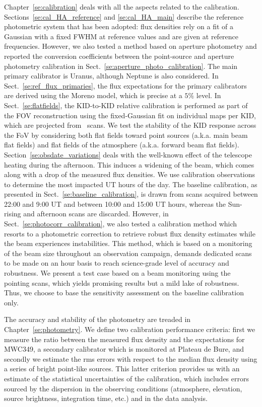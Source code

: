 Chapter~\ref{se:calibration} deals with all the aspects related to the
calibration. Sections~\ref{se:cal_HA_reference}
and \ref{se:cal_HA_main} describe the reference photometric system
that has been adopted: flux densities rely on a fit
of a Gaussian with a fixed FWHM at reference values and are given at
reference frequencies. However, we also tested a method based on aperture
photometry and reported the conversion coefficients between the
point-source and aperture photometry calibration in
Sect.~\ref{se:aperture_photo_calibration}.
The main primary calibrator is Uranus, although Neptune
is also considered. In Sect.~\ref{se:ref_flux_primaries}, the flux
expectations for the primary calibrators are derived using the Moreno
model, which is precise at a $5\%$ level. In
Sect.~\ref{se:flatfields}, the KID-to-KID relative calibration is
performed as part of the FOV reconstruction using the fixed-Gaussian fit on
individual maps per KID, which are projected from \bm\ scans. We test
the stability of the KID response across the FoV by considering both
flat fields toward point sources (a.k.a. main beam flat fields) and
flat fields of the atmosphere (a.k.a. forward beam flat
fields). Section~\ref{se:obsdate_variations} deals with the well-known
effect of the telescope heating during the afternoon. This induces a
widening of the beam, which comes along with a drop of the measured
flux densities. We use calibration observations to determine the most
impacted UT hours of the day. The baseline calibration, as presented
in Sect.~\ref{se:baseline_calibration}, is drawn from
scans acquired between 22:00 and 9:00 UT and between 10:00 and 15:00
UT hours, whereas the Sun-rising and afternoon scans are
discarded. However, in Sect.~\ref{se:photocorr_calibration}, we also
tested a calibration method which resorts to a photometric correction
to retrieve robust flux density estimates while the beam experiences
instabilities. This method, which is based on a monitoring of the beam
size throughout an observation campaign, demands dedicated scans to be
made on an hour basis to reach science-grade level of accuracy and
robustness. We present a test case based on a beam monitoring using
the pointing scans, which yields promising results but a mild lake of
robustness. Thus, we choose to base the sensitivity assessment on the
baseline calibration only.

The accuracy and stability of the photometry are treaded in
Chapter~\ref{se:photometry}. We define two calibration performance
criteria: first we measure the ratio between the measured flux density
and the expectations for MWC349, a secondary calibrator which is
monitored at Plateau de Bure, and secondly we estimate the rms errors
with respect to the median flux density using a series of bright
point-like sources. This latter criterion provides us with an estimate
of the statistical uncertainties of the calibration, which includes
errors sourced by the dispersion in the observing conditions
(atmosphere, elevation, source brightness, integration time, etc.) and
in the data analysis.

